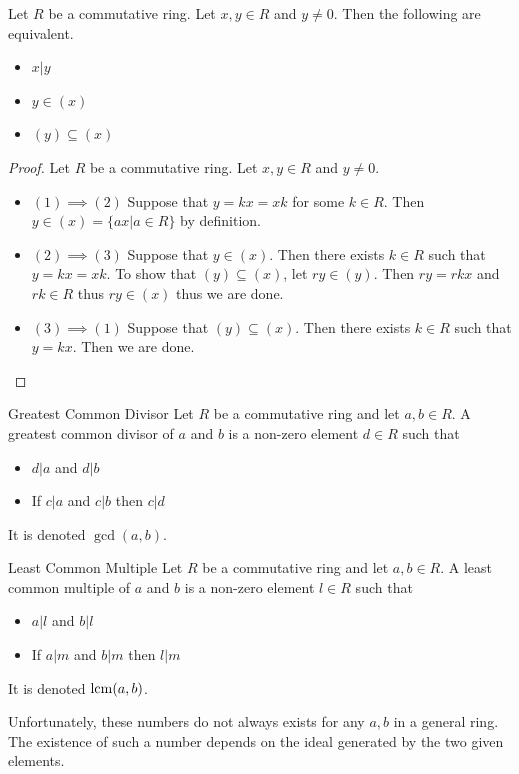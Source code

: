 \documentclass[a4paper]{article}
\begin{document}
\begin{prp}{}{} Let $R$ be a commutative ring. Let $x,y\in R$ and $y\neq 0$. Then the following are equivalent. 
\begin{itemize}
\item $x|y$
\item $y\in(x)$
\item $(y)\subseteq(x)$
\end{itemize}\tcbline
\begin{proof} Let $R$ be a commutative ring. Let $x,y\in R$ and $y\neq 0$. 
\begin{itemize}
\item $(1)\implies(2)$ Suppose that $y=kx=xk$ for some $k\in R$. Then $y\in(x)=\{ax|a\in R\}$ by definition. 
\item $(2)\implies(3)$ Suppose that $y\in(x)$. Then there exists $k\in R$ such that $y=kx=xk$. To show that $(y)\subseteq(x)$, let $ry\in(y)$. Then $ry=rkx$ and $rk\in R$ thus $ry\in(x)$ thus we are done. 
\item $(3)\implies(1)$ Suppose that $(y)\subseteq(x)$. Then there exists $k\in R$ such that $y=kx$. Then we are done. 
\end{itemize}
\end{proof}
\end{prp}

\begin{defn}{Greatest Common Divisor}{} Let $R$ be a commutative ring and let $a,b\in R$. A greatest common divisor of $a$ and $b$ is a non-zero element $d\in R$ such that 
\begin{itemize}
\item $d|a$ and $d|b$
\item If $c|a$ and $c|b$ then $c|d$
\end{itemize} It is denoted $\gcd(a,b)$. 
\end{defn}

\begin{defn}{Least Common Multiple}{} Let $R$ be a commutative ring and let $a,b\in R$. A least common multiple of $a$ and $b$ is a non-zero element $l\in R$ such that 
\begin{itemize}
\item $a|l$ and $b|l$
\item If $a|m$ and $b|m$ then $l|m$
\end{itemize} It is denoted $\operatorname{lcm}(a,b)$. 
\end{defn}

Unfortunately, these numbers do not always exists for any $a,b$ in a general ring. The existence of such a number depends on the ideal generated by the two given elements. 
\end{document}
